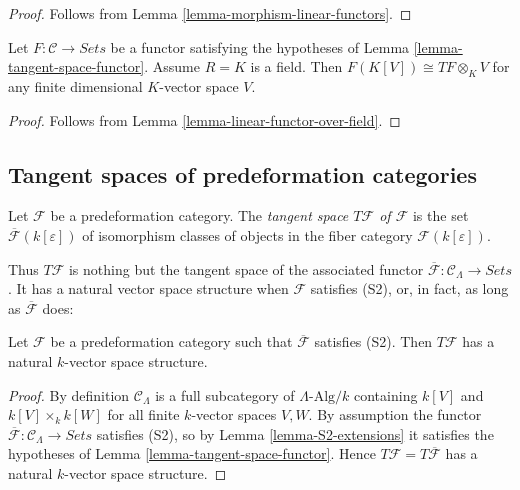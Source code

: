 \begin{proof}
Follows from Lemma \ref{lemma-morphism-linear-functors}.
\end{proof}

\begin{lemma}
\label{lemma-tangent-space-tensor}
Let $F: \mathcal{C} \to \textit{Sets}$ be a functor satisfying the 
hypotheses of Lemma \ref{lemma-tangent-space-functor}.  Assume $R = K$ is a 
field.  Then $F(K[V]) \cong TF \otimes_{K} V$ for any finite dimensional 
$K$-vector space $V$.
\end{lemma}

\begin{proof}
Follows from Lemma \ref{lemma-linear-functor-over-field}.
\end{proof}

\subsection{Tangent spaces of predeformation categories}
\label{subsection-tangent-spaces}

\begin{definition}
\label{definition-tangent-space}
Let $\mathcal{F}$ be a predeformation category.  The {\it tangent space $T 
\mathcal{F}$ of $\mathcal{F}$} is the set $\overline{\mathcal{F}}(k[\varepsilon])$ 
of isomorphism classes of objects in the fiber category $\mathcal 
F(k[\varepsilon])$.
\end{definition}

\noindent
Thus $T \mathcal{F}$ is nothing but the tangent space of the associated functor 
$\overline{\mathcal{F}}: \mathcal{C}_\Lambda \to \textit{Sets}$. 
It has a natural vector space structure when $\mathcal{F}$ satisfies (S2), or, 
in fact, as long as $\overline{\mathcal{F}}$ does:
\begin{lemma}
\label{lemma-tangent-space-vector-space}
Let $\mathcal{F}$ be a predeformation category such that $\overline{\mathcal{F}}$ 
satisfies (S2). Then $T \mathcal{F}$ has a natural $k$-vector space 
structure.
\end{lemma}

\begin{proof}
By definition $\mathcal{C}_\Lambda$ is a full subcategory of 
$\Lambda\text{-Alg}/k$ containing $k[V]$ and $k[V] \times_{k} k[W]$ for 
all finite $k$-vector spaces $V,W$.  By assumption the functor 
$\overline{\mathcal{F}}: \mathcal{C}_\Lambda \to \textit{Sets}$ 
satisfies (S2), so by Lemma \ref{lemma-S2-extensions} it satisfies the 
hypotheses of Lemma \ref{lemma-tangent-space-functor}.  Hence $T \mathcal{F} = T 
\overline{\mathcal{F}}$ has a natural $k$-vector space structure.
\end{proof}

